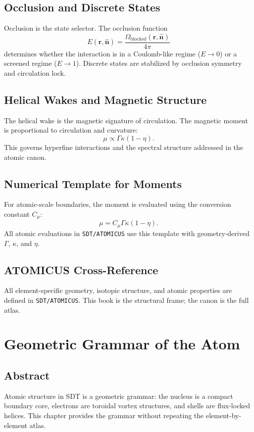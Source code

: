 \documentclass[12pt]{book}
\begin{document}
\section{Occlusion and Discrete States}
Occlusion is the state selector. The occlusion function
\begin{equation}
E(\mathbf{r},\hat{\mathbf{n}}) = \frac{\Omega_{\text{blocked}}(\mathbf{r},\hat{\mathbf{n}})}{4\pi}
\end{equation}
determines whether the interaction is in a Coulomb-like regime ($E \to 0$) or a screened regime ($E \to 1$).
Discrete states are stabilized by occlusion symmetry and circulation lock.

\section{Helical Wakes and Magnetic Structure}
The helical wake is the magnetic signature of circulation. The magnetic moment is proportional to
circulation and curvature:
\begin{equation}
\mu \propto \Gamma \kappa (1-\eta).
\end{equation}
This governs hyperfine interactions and the spectral structure addressed in the atomic canon.

\section{Numerical Template for Moments}
For atomic-scale boundaries, the moment is evaluated using the conversion constant $C_\mu$:
\begin{equation}
\mu = C_\mu \Gamma \kappa (1-\eta).
\end{equation}
All atomic evaluations in \texttt{SDT/ATOMICUS} use this template with geometry-derived $\Gamma$, $\kappa$,
and $\eta$.

\section{ATOMICUS Cross-Reference}
All element-specific geometry, isotopic structure, and atomic properties are defined in \texttt{SDT/ATOMICUS}.
This book is the structural frame; the canon is the full atlas.

\chapter{Geometric Grammar of the Atom}

\section*{Abstract}
Atomic structure in SDT is a geometric grammar: the nucleus is a compact boundary core, electrons are
toroidal vortex structures, and shells are flux-locked helices. This chapter provides the grammar without
repeating the element-by-element atlas.
\end{document}
